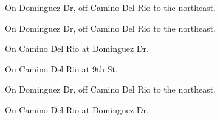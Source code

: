 

\begin{LocationList}

On Dominguez Dr, off   Camino Del Rio to the northeast.

\Location{\GasStation \Gas \Rest}
On Dominguez Dr, off   Camino Del Rio to the northeast.

On   Camino Del Rio at Dominguez Dr.

On  Camino Del Rio at 9th St.

\Location{\TruckService \Service \Rest}
On Dominguez Dr, off   Camino Del Rio to the northeast.

On   Camino Del Rio at Dominguez Dr.

\end{LocationList}
